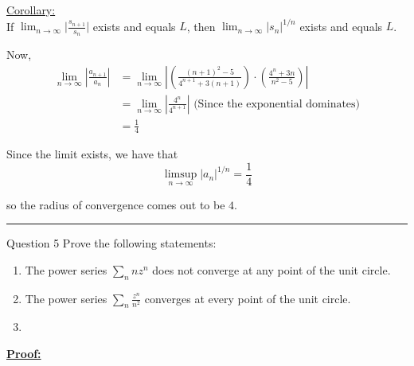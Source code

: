 \documentclass{article}
\begin{document}
\begin{enumerate}[label=(\alph*)]
\begin{dottedbox}
    \vskip 0.5cm
    \underline{Corollary:} \\
    If $\lim_{n \rightarrow \infty} \big\lvert \frac{s_{n+1}}{s_n } \big\rvert$ exists and equals $L$, then  $\lim_{n \rightarrow \infty} \big\lvert s_n \big\rvert^{1/n}$ exists and equals $L$.
  \end{dottedbox}
   
  Now, 
  \begin{align*}
    \lim_{n \rightarrow \infty} \left| \frac{a_{n+1}}{a_n} \right| &= \lim_{n \rightarrow \infty} \left| \left( \frac{(n+1)^2 - 5}{4^{n+1} + 3(n+1)} \right) \cdot \left( \frac{4^n + 3n}{n^2 - 5} \right) \right| \\
    &= \lim_{n \rightarrow \infty} \left| \frac{4^n}{4^{n+1}} \right| \text{   (Since the exponential dominates)} \\
    &= \frac{1}{4}
  \end{align*}

  Since the limit exists, we have that 
  \[ \limsup_{n \rightarrow \infty} |a_n|^{1/n} =\frac{1}{4} \]

  so the radius of convergence comes out to be $4$.
\end{enumerate}

\vskip 0.5cm
\hrule 
\vskip 0.5cm

\begin{mathdefinitionbox}{Question 5}
\vskip 0.5cm
Prove the following statements:
\begin{enumerate}[label=(\alph*)]
  \item The power series $\sum_n nz^n$ does not converge at any point of the unit circle.
  \item The power series $\sum_n \frac{z^n}{n^2}$ converges at every point of the unit circle.
  \item 
\end{enumerate}
\end{mathdefinitionbox}

\vskip 0.5cm
\underline{\textbf{Proof:}}
\end{document}
